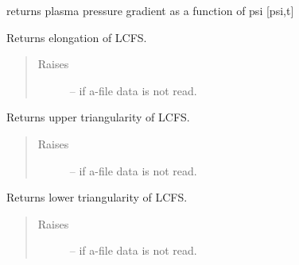 \documentclass[letterpaper,10pt,english]{sphinxmanual}
\begin{document}
\begin{fulllineitems}
\begin{fulllineitems}
\label{eqtools:eqtools.eqdskreader.EqdskReader.getPPrime}
returns plasma pressure gradient as a function of psi {[}psi,t{]}

\end{fulllineitems}


\begin{fulllineitems}
\label{eqtools:eqtools.eqdskreader.EqdskReader.getElongation}
Returns elongation of LCFS.
\begin{quote}\begin{description}
\item[{Raises}] \leavevmode
{} -- 
if a-file data is not read.

\end{description}\end{quote}

\end{fulllineitems}


\begin{fulllineitems}
\label{eqtools:eqtools.eqdskreader.EqdskReader.getUpperTriangularity}
Returns upper triangularity of LCFS.
\begin{quote}\begin{description}
\item[{Raises}] \leavevmode
{} -- 
if a-file data is not read.

\end{description}\end{quote}

\end{fulllineitems}


\begin{fulllineitems}
\label{eqtools:eqtools.eqdskreader.EqdskReader.getLowerTriangularity}
Returns lower triangularity of LCFS.
\begin{quote}\begin{description}
\item[{Raises}] \leavevmode
{} -- 
if a-file data is not read.


\end{description}
\end{quote}
\end{fulllineitems}
\end{fulllineitems}
\end{document}
